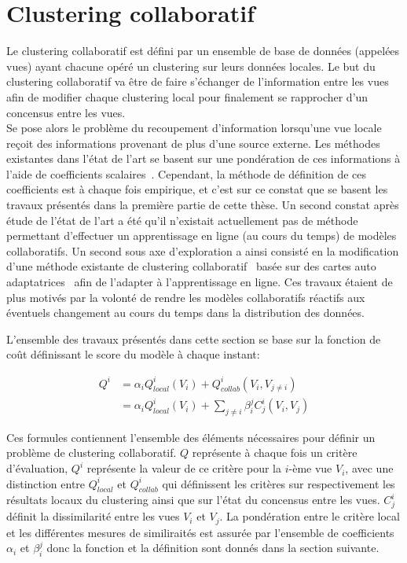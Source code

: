 \section{Clustering collaboratif}


Le clustering collaboratif est défini par un ensemble de base de données (appelées vues) ayant chacune opéré un clustering sur leurs données locales. Le but du clustering collaboratif va être de faire s'échanger de l'information entre les vues afin de modifier chaque clustering local pour finalement se rapprocher d'un concensus entre les vues.\\

Se pose alors le problème du recoupement d'information lorsqu'une vue locale reçoit des informations provenant de plus d'une source externe. Les méthodes existantes dans l'état de l'art se basent sur une pondération de ces informations à l'aide de coefficients scalaires~\cite{cornuejols2018collaborative,pedrycz2002collaborative,maurel2017incremental,ghassany2012collaborative,sublime2016collaborative,rastin2015collaborative}. Cependant, la méthode de définition de ces coefficients est à chaque fois empirique, et c'est sur ce constat que se basent les travaux présentés dans la première partie de cette thèse. Un second constat après étude de l'état de l'art a été qu'il n'existait actuellement pas de méthode permettant d'effectuer un apprentissage en ligne (au cours du temps) de modèles collaboratifs. Un second sous axe d'exploration a ainsi consisté en la modification d'une méthode existante de clustering collaboratif~\cite{ghassany2012collaborative} basée sur des cartes auto adaptatrices~\cite{KOHO1} afin de l'adapter à l'apprentissage en ligne. Ces travaux étaient de plus motivés par la volonté de rendre les modèles collaboratifs réactifs aux éventuels changement au cours du temps dans la distribution des données.

L'ensemble des travaux présentés dans cette section se base sur la fonction de co\^{u}t définissant le score du modèle à chaque instant:

\begin{align}
    \label{sum_eq:sum_globalC}
    Q^i &= \alpha_i Q^i_{local}(V_i) + Q^i_{collab}(V_i, V_{j\neq i})\\
    &= \alpha_i Q^i_{local}(V_i) + \sum_{j\neq i} \beta_i^j C_j^i(V_i, V_j)
\end{align}

Ces formules contiennent l'ensemble des éléments nécessaires pour définir un problème de clustering collaboratif. $Q$ représente à chaque fois un critère d'évaluation, $Q^i$ représente la valeur de ce critère pour la $i$-ème vue $V_i$, avec une distinction entre $Q^i_{local}$ et $Q^i_{collab}$ qui définissent les critères sur respectivement les résultats locaux du clustering ainsi que sur l'état du concensus entre les vues. $C_j^i$ définit la dissimilarité entre les vues $V_i$ et $V_j$. La pondération entre le critère local et les différentes mesures de similiraités est assurée par l'ensemble de coefficients $\alpha_i$ et $\beta^j_i$ donc la fonction et la définition sont donnés dans la section suivante.

